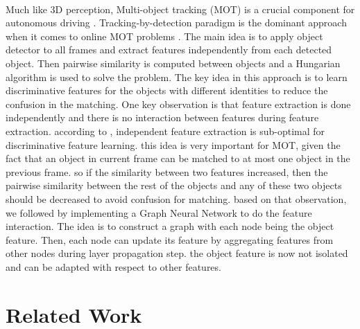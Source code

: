 \documentclass[10pt,twocolumn,letterpaper]{article}
\begin{document}
\paragraph{}
Much like 3D perception, Multi-object tracking (MOT) is a crucial component for autonomous driving \cite{luo2018fast}. Tracking-by-detection paradigm is the dominant approach when it comes to online MOT problems \cite{bewley2016simple, weng2019baseline}. The main idea is to apply object detector to all frames and extract features independently from each detected object. Then pairwise similarity is computed between objects and a Hungarian algorithm \cite{kuhn1955hungarian} is used to solve the problem. The key idea in this approach is to learn discriminative features for the objects with different identities to reduce the confusion in the matching. One key observation is that feature extraction is done independently and there is no interaction between features during feature extraction. according to \cite{weng2020gnn3dmot}, independent feature extraction is sub-optimal for discriminative feature learning. this idea is very important for MOT, given the fact that an object in current frame can be matched to at most one object in the previous frame. so if the similarity between two features increased, then the pairwise similarity between the rest of the objects and any of these two objects should be decreased to avoid confusion for matching. based on that observation, we followed \cite{weng2020gnn3dmot} by implementing a Graph Neural Network to do the feature interaction. The idea is to construct a graph with each node being the object feature. Then, each node can update its feature by aggregating features from other nodes during layer propagation step. the object feature is now not isolated and can be adapted with respect to other features.

\section{Related Work}
\end{document}
